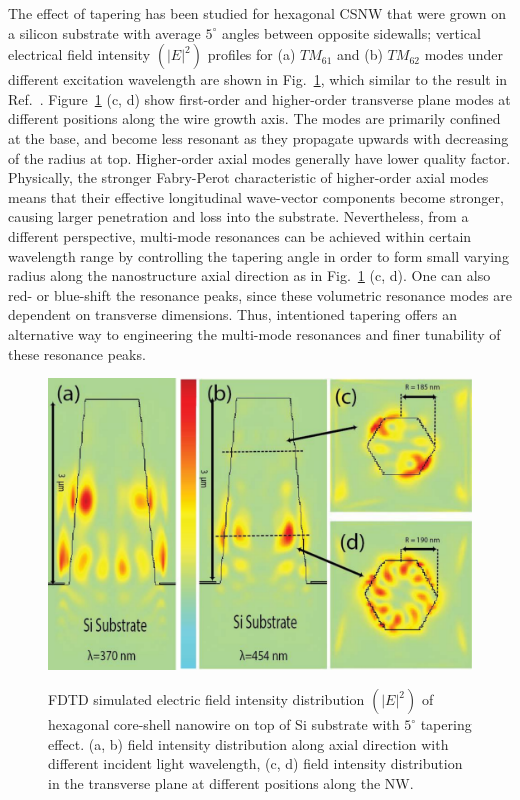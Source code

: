 The effect of tapering has been studied for hexagonal CSNW that were grown on a
silicon substrate with average $5^{\circ}$ angles between opposite sidewalls;
vertical electrical field intensity $({|E|}^2)$ profiles for (a) ${TM}_{61}$
and (b) ${TM}_{62}$ modes under different excitation wavelength are shown in
Fig.~\ref{Tapering}, which similar to the result in Ref.~\cite{Chen:2011cg}.
Figure~\ref{Tapering} (c, d) show first-order and higher-order transverse plane
modes at different positions along the wire growth axis. The modes are
primarily confined at the base, and become less resonant as they propagate
upwards with decreasing of the radius at top. Higher-order axial modes
generally have lower quality factor.  Physically, the stronger Fabry-Perot
characteristic of higher-order axial modes means that their effective
longitudinal wave-vector components become stronger, causing larger penetration
and loss into the substrate. Nevertheless, from a different perspective,
multi-mode resonances can be achieved within certain wavelength range by
controlling the tapering angle in order to form small varying radius along the
nanostructure axial direction as in Fig.~\ref{Tapering} (c, d). One can also
red- or blue-shift the resonance peaks, since these volumetric resonance modes
are dependent on transverse dimensions. Thus, intentioned tapering offers an
alternative way to engineering the multi-mode resonances and finer tunability
of these resonance peaks.

\begin{figure}
  \caption{FDTD simulated electric field intensity distribution $({|E|}^2)$ of hexagonal core-shell nanowire on top of Si substrate with $5^{\circ}$ tapering effect. (a, b) field intensity distribution along axial direction with different incident light wavelength, (c, d) field intensity distribution in the transverse plane at different positions along the NW.}
  \centering
  \includegraphics[width=\textwidth]{pictures/LM/Tapering}
  \label{Tapering}
\end{figure}

